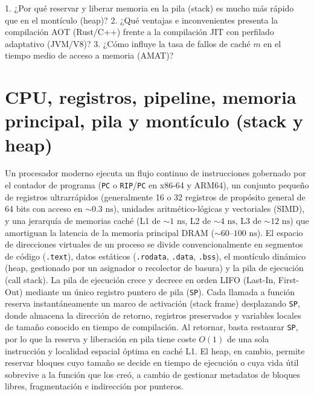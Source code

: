 \documentclass{book}
\begin{document}
\begin{tcolorbox}[title={Autoficha}, studiumcheck, breakable]

1. ¿Por qué reservar y liberar memoria en la pila (stack) es mucho más rápido que en el montículo (heap)? 2. ¿Qué ventajas e inconvenientes presenta la compilación AOT (Rust/C++) frente a la compilación JIT con perfilado adaptativo (JVM/V8)? 3. ¿Cómo influye la tasa de fallos de caché \(m\) en el tiempo medio de acceso a memoria (AMAT)?
\end{tcolorbox}

\section{CPU, registros, pipeline, memoria principal, pila y montículo (stack y heap)}

Un procesador moderno ejecuta un flujo continuo de instrucciones gobernado por el contador de programa (\texttt{PC} o \texttt{RIP}/\texttt{PC} en x86-64 y ARM64), un conjunto pequeño de registros ultrarrápidos (generalmente 16 o 32 registros de propósito general de 64 bits con acceso en \(\sim 0.3\text{ ns}\)), unidades aritmético-lógicas y vectoriales (SIMD), y una jerarquía de memorias caché (L1 de \(\sim 1\text{ ns}\), L2 de \(\sim 4\text{ ns}\), L3 de \(\sim 12\text{ ns}\)) que amortiguan la latencia de la memoria principal DRAM (\(\sim 60\text{--}100\text{ ns}\)). El espacio de direcciones virtuales de un proceso se divide convencionalmente en segmentos de código (\texttt{.text}), datos estáticos (\texttt{.rodata}, \texttt{.data}, \texttt{.bss}), el montículo dinámico (heap, gestionado por un asignador o recolector de basura) y la pila de ejecución (call stack).
La pila de ejecución crece y decrece en orden LIFO (Last-In, First-Out) mediante un único registro puntero de pila (\texttt{SP}). Cada llamada a función reserva instantáneamente un marco de activación (stack frame) desplazando \texttt{SP}, donde almacena la dirección de retorno, registros preservados y variables locales de tamaño conocido en tiempo de compilación. Al retornar, basta restaurar \texttt{SP}, por lo que la reserva y liberación en pila tiene coste \(O(1)\) de una sola instrucción y localidad espacial óptima en caché L1. El heap, en cambio, permite reservar bloques cuyo tamaño se decide en tiempo de ejecución o cuya vida útil sobrevive a la función que los creó, a cambio de gestionar metadatos de bloques libres, fragmentación e indirección por punteros.
\end{document}
